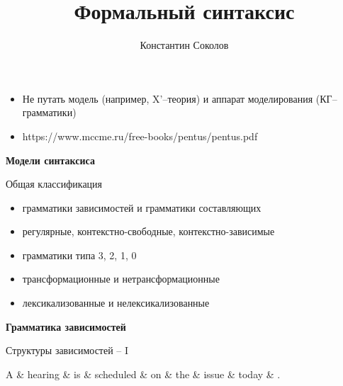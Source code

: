 \documentclass{beamer}
\begin{document}
\title{\large{\sc Формальный синтаксис}}
\author{Константин Соколов}

\begin{frame}
    \thispagestyle{empty}
    \titlepage
\end{frame}

\begin{frame}{}
\begin{itemize}
	\item Не путать модель (например, X'--теория) и аппарат моделирования (КГ--грамматики)
	\item https://www.mccme.ru/free-books/pentus/pentus.pdf
\end{itemize}
\end{frame}


\begin{frame}{}
\begin{center}
	\textbf{Модели синтаксиса}
\end{center}
\end{frame}

\begin{frame}{Общая классификация}
\begin{itemize}
    \item грамматики зависимостей и грамматики составляющих
    \item регулярные, контекстно-свободные, контекстно-зависимые
    \item грамматики типа 3, 2, 1, 0 
    \item трансформационные и нетрансформационные 
    \item лексикализованные и нелексикализованные 
\end{itemize}
\end{frame}

\begin{frame}{}
\begin{center}
	\textbf{Грамматика зависимостей}
\end{center}
\end{frame}

\begin{frame}{Структуры зависимостей -- I}
\begin{dependency}[theme = simple]
   \begin{deptext}[column sep=1em]
      A \& hearing \& is \& scheduled \& on \& the \& issue \& today \& . \\
   \end{deptext}
\end{dependency}
\end{frame}
\end{document}
